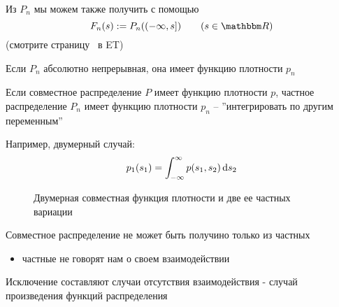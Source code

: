 \begin{frame}

    \vspace{2em}
    Из $P_n$ мы можем также получить  с помощью 
    \begin{equation*}
        \label{eq:ntf}
        F_{n}(s) := P_{n}( (-\infty, s] )
        \qquad (s \in \RR)
    \end{equation*}
    (смотрите страницу~\pageref{ET-eq:ntf} в ET)
    
    \vspace{1em}
    Если $P_n$ абсолютно непрерывная, она имеет функцию плотности $p_n$
    
    Если совместное распределение $P$ имеет функцию плотности $p$, частное распределение 
    $P_n$ имеет функцию плотности $p_n$ -- ''интегрировать по другим переменным''
    
    \vspace{.7em}
    Например, двумерный случай:
    \begin{equation*}
        p_1(s_1)
        = \int_{-\infty}^{\infty} p(s_1, s_2) \mathop{}\!\mathrm{d} s_2
    \end{equation*}
    
\end{frame}

\begin{frame}
    
    \vspace{2em}
    \begin{figure}
       \begin{center}
        \caption{\label{f:jointplot} Двумерная совместная функция плотности и две ее частных вариации}
       \end{center}
    \end{figure}
    
\end{frame}

\begin{frame}

    \vspace{2em}
    Совместное распределение не может быть получино только из частных
    \begin{itemize}
        \item частные не говорят нам о своем взаимодействии
    \end{itemize} 
    
    \vspace{1em}
    Исключение составляют случаи отсутствия взаимодействия - случай произведения функций распределения 
    
\end{frame}


